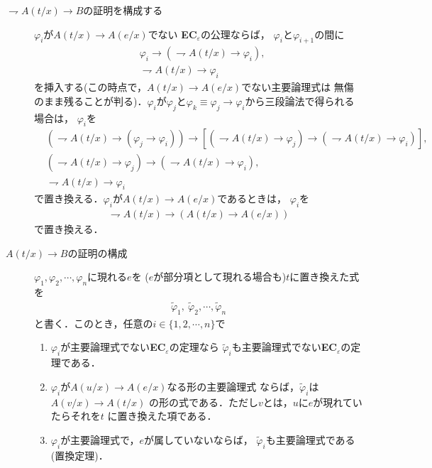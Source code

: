 	\begin{description}
		\item[$\rightharpoondown A(t/x) \rightarrow B$の証明を構成する]
			$\varphi_{i}$が$A(t/x) \rightarrow A(e/x)$でない
			{\bf EC}${}_{\varepsilon}$の公理ならば，
			$\varphi_{i}$と$\varphi_{i+1}$の間に
			\begin{align}
				&\varphi_{i} \rightarrow 
				(\rightharpoondown A(t/x) \rightarrow \varphi_{i}), \\
				&\rightharpoondown A(t/x) \rightarrow \varphi_{i}
			\end{align}
			を挿入する(この時点で，$A(t/x) \rightarrow A(e/x)$でない主要論理式は
			無傷のまま残ることが判る)．$\varphi_{i}$が$\varphi_{j}$と$\varphi_{k}
			\equiv \varphi_{j} \rightarrow \varphi_{i}$から三段論法で得られる場合は，
			$\varphi_{i}$を
			\begin{align}
				&(\rightharpoondown A(t/x) \rightarrow (\varphi_{j} \rightarrow \varphi_{i})) \rightarrow
				[(\rightharpoondown A(t/x) \rightarrow \varphi_{j})
				\rightarrow (\rightharpoondown A(t/x) \rightarrow \varphi_{i})], \\
				&(\rightharpoondown A(t/x) \rightarrow \varphi_{j})
				\rightarrow (\rightharpoondown A(t/x) \rightarrow \varphi_{i}), \\
				&\rightharpoondown A(t/x) \rightarrow \varphi_{i}
			\end{align}
			で置き換える．$\varphi_{i}$が$A(t/x) \rightarrow A(e/x)$であるときは，
			$\varphi_{i}$を
			\begin{align}
				\rightharpoondown A(t/x) \rightarrow (A(t/x) \rightarrow A(e/x))
			\end{align}
			で置き換える．
	
		\item[$A(t/x) \rightarrow B$の証明の構成]
			$\varphi_{1},\varphi_{2},\cdots,\varphi_{n}$に現れる$e$を
			($e$が部分項として現れる場合も)$t$に置き換えた式を
			\begin{align}
				\tilde{\varphi}_{1},\ \tilde{\varphi}_{2},\cdots, \tilde{\varphi}_{n}
			\end{align}
			と書く．このとき，任意の$i \in \{1,2,\cdots,n\}$で
			\begin{enumerate}
				\item $\varphi_{i}$が主要論理式でない{\bf EC}${}_{\varepsilon}$の定理なら
					$\tilde{\varphi}_{i}$も主要論理式でない{\bf EC}${}_{\varepsilon}$の定理である．
				\item $\varphi_{i}$が$A(u/x) \rightarrow A(e/x)$なる形の主要論理式
					ならば，$\tilde{\varphi}_{i}$は$A(v/x) \rightarrow A(t/x)$
					の形の式である．ただし$v$とは，$u$に$e$が現れていたらそれを$t$
					に置き換えた項である\footnotemark．
				\item $\varphi_{i}$が主要論理式で，$e$が属していないならば，
					$\tilde{\varphi}_{i}$も主要論理式である(置換定理)．
			\end{enumerate}
			

\end{description}
